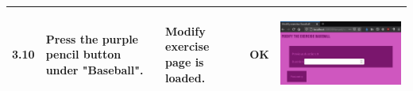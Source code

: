 \documentclass[12pt,twoside,titlepage,a4paper]{article}
\theoremstyle{definicion}
\theoremstyle{lema}
\theoremstyle{teorema}
\theoremstyle{corolario}
\theoremstyle{ejemplo}
\theoremstyle{nota}
\begin{document}
\begin{table}[!h]
\begin{tabular}{|m{0.6cm}|m{2.9cm}|m{3.6cm}|m{1.1cm}|m{5.9cm}|}
		\hline
		3.10 & Press the purple pencil button under "Baseball". & Modify exercise page is loaded. & OK &
		\begin{center}\includegraphics[scale=0.24]{userpage5-modifysport.png}\end{center} \\
		\hline
	\end{tabular}
\end{table}
\newpage
\end{document}

